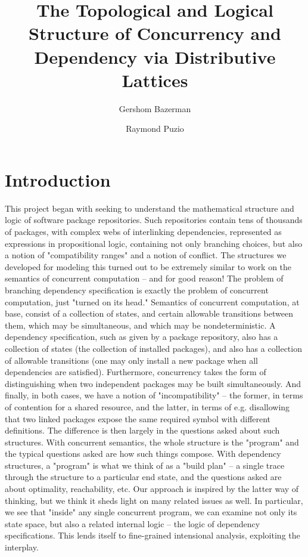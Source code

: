 \documentclass[hoptionsi,review,format=acmsmall]{acmart}
\title[Concurrency and Dependency via Distributive Lattices]{The Topological and Logical Structure of Concurrency and Dependency via Distributive Lattices}
\author{Gershom Bazerman}
\affiliation{%
   \institution{Awake Security}}
\author{Raymond Puzio}
\affiliation{%
   \institution{Albert Einstein Institute}}
\theoremstyle{definition}
\begin{document}
\maketitle

\section{Introduction}
This project began with seeking to understand the mathematical structure and logic of software package repositories. Such repositories contain tens of thousands of packages, with complex webs of interlinking dependencies, represented as expressions in propositional logic, containing not only branching choices, but also a notion of "compatibility ranges" and a notion of conflict. The structures we developed for modeling this turned out to be extremely similar to work on the semantics of concurrent computation -- and for good reason! The problem of branching dependency specification is exactly the problem of concurrent computation, just "turned on its head." Semantics of concurrent computation, at base, consist of a collection of states, and certain allowable transitions between them, which may be simultaneous, and which may be nondeterministic. A dependency specification, such as given by a package repository, also has a collection of states (the collection of installed packages), and also has a collection of allowable transitions (one may only install a new package when all dependencies are satisfied). Furthermore, concurrency takes the form of distinguishing when two independent packages may be built simultaneously. And finally, in both cases, we have a notion of "incompatibility" -- the former, in terms of contention for a shared resource, and the latter, in terms of e.g. disallowing that two linked packages expose the same required symbol with different definitions. The difference is then largely in the questions asked about such structures. With concurrent semantics, the whole structure is the "program" and the typical questions asked are how such things compose. With dependency structures, a "program" is what we think of as a "build plan" -- a single trace through the structure to a particular end state, and the questions asked are about optimality, reachability, etc. Our approach is inspired by the latter way of thinking, but we think it sheds light on many related issues as well. In particular, we see that "inside" any single concurrent program, we can examine not only its state space, but also a related internal logic -- the logic of dependency specifications. This lends itself to fine-grained intensional analysis, exploiting the interplay.
\end{document}
